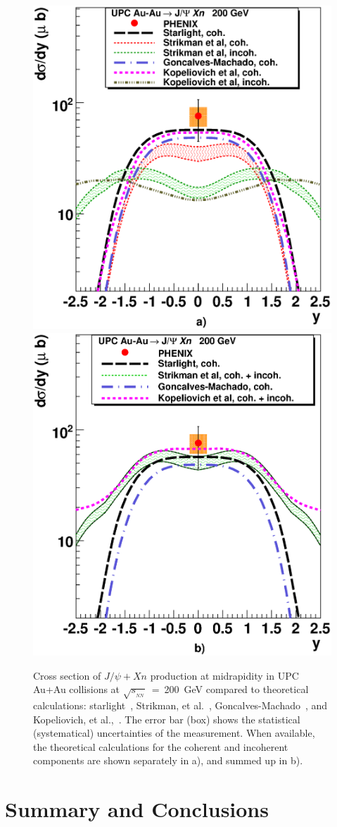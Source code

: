 \documentclass[dvipdfm]{elsart}
\newcommand{\sqrtsnn}{\sqrt{s_{_{NN}}}}
\providecommand{\jpsi}{J/\psi}
\begin{document}
\begin{figure}[tbh]
\begin{center}
\includegraphics[width=0.49\columnwidth]{upc_dNdeta_jpsi_predictions_rhic_c_in_sep.eps}
\includegraphics[width=0.49\columnwidth]{upc_dNdeta_jpsi_predictions_rhic_c_in_joint.eps}
\end{center}
\caption{
Cross section of $\jpsi + Xn$ production at midrapidity in UPC Au+Au 
collisions at $\sqrtsnn$~=~200~GeV compared to theoretical 
calculations:  
{\sc starlight}~\protect\cite{Baltz:2002pp,Klein:1999qj,Nystrand:2004vn},
Strikman, et al.~\protect\cite{Strikman:2005ze}, 
Goncalves-Machado~\protect\cite{Goncalves:2007qu}, and 
Kopeliovich, et al.,~\protect\cite{Ivanov:2007ms}.
The error bar (box) shows the statistical (systematical) uncertainties of the 
measurement. When available, the theoretical calculations for the coherent 
and incoherent components are shown separately in a), and summed up in b).}
\label{fig:dNdy_vs_model}
\end{figure}

\section{Summary and Conclusions}
\label{section:summary}
\end{document}
